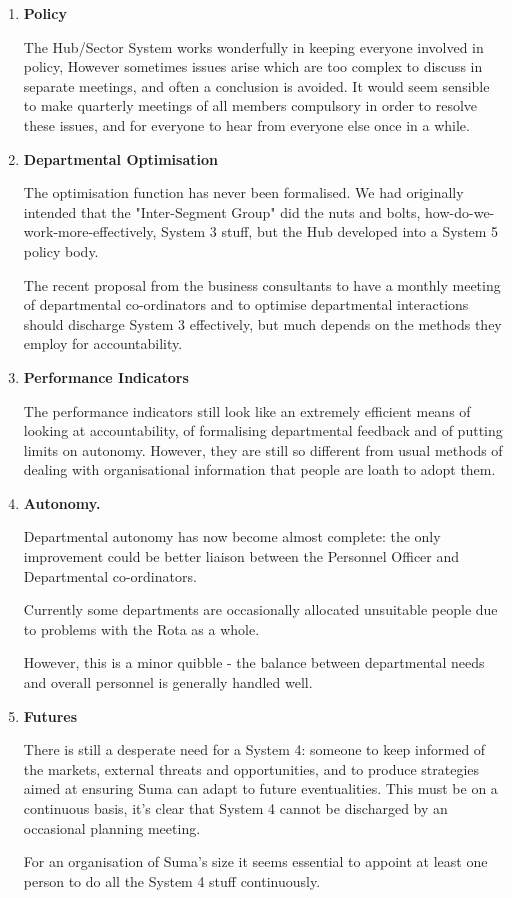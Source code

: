 \begin{enumerate}
  \item \textbf{Policy}

The Hub/Sector System works wonderfully in keeping everyone involved in policy, However sometimes issues arise which are too complex to discuss in separate meetings, and often a conclusion is avoided. It would seem sensible to make quarterly meetings of all members compulsory in order to resolve these issues, and for everyone to hear from everyone else once in a while.

  \item \textbf{Departmental Optimisation}

The optimisation function has never been formalised. We had originally intended that the "Inter-Segment Group" did the nuts and bolts, how-do-we-work-more-effectively, System 3 stuff, but the Hub developed into a System 5 policy body.

The recent proposal from the business consultants to have a monthly meeting of departmental co-ordinators and to optimise departmental interactions should discharge System 3 effectively, but much depends on the methods they employ for accountability.

  \item \textbf{Performance Indicators}

The performance indicators still look like an extremely efficient means of looking at accountability, of formalising departmental feedback and of putting limits on autonomy. However, they are still so different from usual methods of dealing with organisational information that people are loath to adopt them.

  \item \textbf{Autonomy.}

Departmental autonomy has now become almost complete: the only improvement could be better liaison between the Personnel Officer and Departmental co-ordinators.

Currently some departments are occasionally allocated unsuitable people due to problems with the Rota as a whole.

However, this is a minor quibble - the balance between departmental needs and overall personnel is generally handled well.

  \item \textbf{Futures}

There is still a desperate need for a System 4: someone to keep informed of the markets, external threats and opportunities, and to produce strategies aimed at ensuring Suma can adapt to future eventualities. This must be on a continuous basis, it's clear that System 4 cannot be discharged by an occasional planning meeting.

For an organisation of Suma's size it seems essential to appoint at least one person to do all the System 4 stuff continuously.

\end{enumerate}

